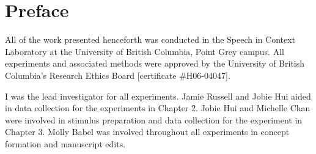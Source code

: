 
\chapter{Preface}

All of the work presented henceforth was conducted in the Speech in Context Laboratory at the University of British Columbia, Point Grey campus. 
All experiments and associated methods were approved by the University of British Columbia's Research Ethics Board [certificate \#H06-04047].

I was the lead investigator for all experiments.  
Jamie Russell and Jobie Hui aided in data collection for the experiments in Chapter 2.  
Jobie Hui and Michelle Chan were involved in stimulus preparation and data collection for the experiment in Chapter 3.
Molly Babel was involved throughout all experiments in concept formation and manuscript edits.